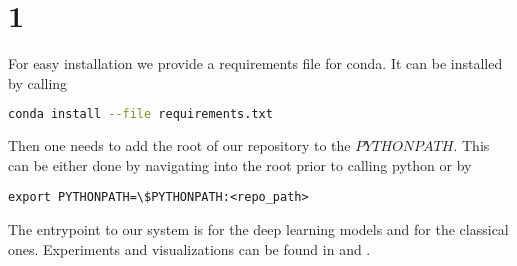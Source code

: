 \section{1}
For easy installation we provide a requirements file for conda. It can be installed by calling
\begin{lstlisting}[language=bash]
conda install --file requirements.txt 
\end{lstlisting}
Then one needs to add the root of our repository to the $PYTHONPATH$. This can be either done by navigating into the root prior to calling python or by
\begin{lstlisting}
export PYTHONPATH=\$PYTHONPATH:<repo_path>
\end{lstlisting}
The entrypoint to our system is  for the deep learning models and  for the classical ones.
Experiments and visualizations can be found in  and .
